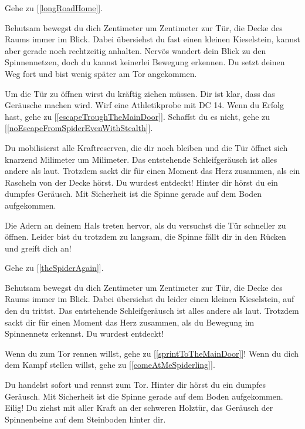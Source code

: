 Gehe zu [\ref{longRoadHome}].


Behutsam bewegst du dich Zentimeter um Zentimeter zur Tür, die Decke des Raums immer im Blick. Dabei übersiehst du fast einen kleinen Kieselstein, kannst aber gerade noch rechtzeitig anhalten. Nervös wandert dein Blick zu den Spinnennetzen, doch du kannst keinerlei Bewegung erkennen.
Du setzt deinen Weg fort und bist wenig später am Tor angekommen.

Um die Tür zu öffnen wirst du kräftig ziehen müssen. Dir ist klar, dass das Geräusche machen wird. Wirf eine Athletikprobe mit DC 14. Wenn du Erfolg hast, gehe zu [\ref{escapeTroughTheMainDoor}]. Schaffst du es nicht, gehe zu [\ref{noEscapeFromSpiderEvenWithStealth}].


Du mobilisierst alle Kraftreserven, die dir noch bleiben und die Tür öffnet sich knarzend Milimeter um Milimeter. Das entstehende Schleifgeräusch ist alles andere als laut. Trotzdem sackt dir für einen Moment das Herz zusammen, als ein Rascheln von der Decke hörst. Du wurdest entdeckt! Hinter dir hörst du ein dumpfes Geräusch. Mit Sicherheit ist die Spinne gerade auf dem Boden aufgekommen.

Die Adern an deinem Hals treten hervor, als du versuchst die Tür schneller zu öffnen.
Leider bist du trotzdem zu langsam, die Spinne fällt dir in den Rücken und greift dich an!

Gehe zu [\ref{theSpiderAgain}].


Behutsam bewegst du dich Zentimeter um Zentimeter zur Tür, die Decke des Raums immer im Blick. Dabei übersiehst du leider einen kleinen Kieselstein, auf den du trittst. Das entstehende Schleifgeräusch ist alles andere als laut. Trotzdem sackt dir für einen Moment das Herz zusammen, als du Bewegung im Spinnennetz erkennst. Du wurdest entdeckt!

Wenn du zum Tor rennen willst, gehe zu [\ref{sprintToTheMainDoor}]!
Wenn du dich dem Kampf stellen willst, gehe zu [\ref{comeAtMeSpiderling}].


Du handelst sofort und rennst zum Tor. Hinter dir hörst du ein dumpfes Geräusch. Mit Sicherheit ist die Spinne gerade auf dem Boden aufgekommen. Eilig! Du ziehst mit aller Kraft an der schweren Holztür, das Geräusch der Spinnenbeine auf dem Steinboden hinter dir.

